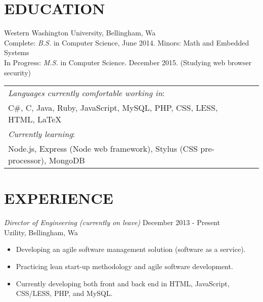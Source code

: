 \documentclass[line,margin]{res}
\begin{document}
\address{835 N State St. Apt 310 Bellingham, WA 98225}
\address{(425) 241-7977 \hspace{13mm} kyle.rader@ieee.org}
 
\begin{resume}
 
\section{EDUCATION}   Western Washington University, Bellingham, Wa\\
			     Complete: {\sl B.S.} in Computer Science, June 2014. Minors: Math and Embedded Systems\\
			      In Progress: {\sl M.S.} in Computer Science. December 2015. (Studying web browser security)
			      	      
	\begin{table}[h]
		\begin{tabular}{ l l l }
			{\sl Languages currently comfortable working in}: \\
			C\#, C, Java, Ruby, JavaScript, MySQL, PHP, CSS, LESS, HTML, {\LaTeX}
			\vspace{.1cm} \\
			{\sl Currently learning}: \\
			Node.js, Express (Node web framework), Stylus (CSS pre-processor), MongoDB
		\end{tabular}
 	\end{table}

\section{EXPERIENCE}

		{\sl Director of Engineering (currently on leave)} \hfill December 2013 - Present \\
                	Uzility, Bellingham, Wa
               	 \begin{itemize}  \itemsep -2pt
                		\item Developing an agile software management solution (software as a service).
                		\item Practicing lean start-up methodology and agile software development. 
                		\item Currently developing both front and back end in HTML, JavaScript, CSS/LESS, PHP, and MySQL.
                	\end{itemize}


\end{resume}
\end{document}
